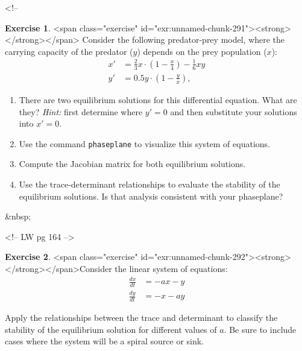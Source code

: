 \documentclass[
]{book}
\theoremstyle{definition}
\theoremstyle{definition}
\theoremstyle{definition}
\newtheorem{exercise}{Exercise}[chapter]
\theoremstyle{remark}
\begin{document}
<!-- %
\begin{exercise}
<span class="exercise" id="exr:unnamed-chunk-291"><strong>\label{exr:unnamed-chunk-291} </strong></span> Consider the following predator-prey model, where the carrying capacity of the predator ($y$) depends on the prey population ($x$):
\begin{align*}
x' &= \frac{2}{3} x \cdot \left(1- \frac{x}{4} \right) - \frac{1}{6} xy \\
y' &= 0.5y \cdot \left(1 - \frac{y}{x} \right),
\end{align*}

\begin{enumerate}[label=\alph*.]
\item There are two equilibrium solutions for this differential equation.  What are they? \emph{Hint:} first determine where $y'=0$ and then substitute your solutions into $x'=0$.
\item Use the command \texttt{phaseplane} to visualize this system of equations. 
\item Compute the Jacobian matrix for both equilibrium solutions.
\item Use the trace-determinant relationships to evaluate the stability of the equilibrium solutions. Is that analysis consistent with your phaseplane?
\end{enumerate}
\end{exercise}
&nbsp;


<!-- LW pg 164 -->
\begin{exercise}
<span class="exercise" id="exr:unnamed-chunk-292"><strong>\label{exr:unnamed-chunk-292} </strong></span>Consider the linear system of equations:
\begin{equation}
\begin{split}
\frac{dx}{dt}&=-ax-y \\
\frac{dy}{dt} &= -x-ay
\end{split}
\end{equation}

Apply the relationships between the trace and determinant to classify the stability of the equilibrium solution for different values of $a$.  Be sure to include cases where the system will be a spiral source or sink.
\end{exercise}
\end{document}
